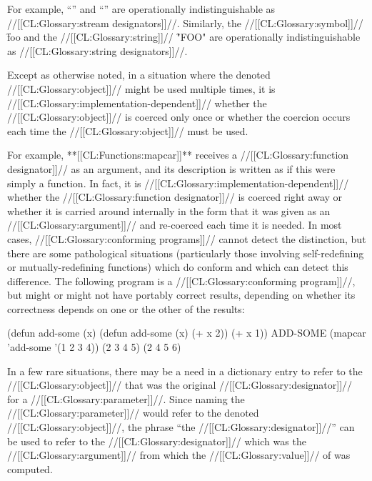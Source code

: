 For example, ``\nil'' and ``'' are operationally indistinguishable as //[[CL:Glossary:stream designators]]//.  Similarly,  the //[[CL:Glossary:symbol]]// \f{foo} and the //[[CL:Glossary:string]]// \f{"FOO"}  are operationally indistinguishable as //[[CL:Glossary:string designators]]//.  

Except as otherwise noted, in a situation where the denoted //[[CL:Glossary:object]]//  might be used multiple times, it is //[[CL:Glossary:implementation-dependent]]// whether the //[[CL:Glossary:object]]// is coerced only once or whether the coercion occurs each time the //[[CL:Glossary:object]]// must be used.

For example, **[[CL:Functions:mapcar]]** receives a //[[CL:Glossary:function designator]]// as an argument, and its description is written as if this were simply a function.  In fact, it is //[[CL:Glossary:implementation-dependent]]// whether the //[[CL:Glossary:function designator]]// is  coerced right away or whether it is carried around internally in the form that it was given as an //[[CL:Glossary:argument]]// and re-coerced each time it is needed.  In most cases, //[[CL:Glossary:conforming programs]]// cannot detect the distinction, but there are some  pathological situations (particularly those involving self-redefining or  mutually-redefining functions) which do conform and which can detect this difference. The following program is a //[[CL:Glossary:conforming program]]//, but might or might not have portably correct results, depending on whether its correctness depends on one or the other of the results:

\code
 (defun add-some (x) 
   (defun add-some (x) (+ x 2))
   (+ x 1)) \EV ADD-SOME
 (mapcar 'add-some '(1 2 3 4)) \EV (2 3 4 5) \OV (2 4 5 6) \endcode

In a few rare situations, there may be a need in a dictionary entry to refer to the //[[CL:Glossary:object]]// that was the original //[[CL:Glossary:designator]]// for a //[[CL:Glossary:parameter]]//. Since naming the //[[CL:Glossary:parameter]]// would refer to the denoted //[[CL:Glossary:object]]//, the phrase ``the  //[[CL:Glossary:designator]]//''  can be used to refer to the //[[CL:Glossary:designator]]// which was the //[[CL:Glossary:argument]]// from which the //[[CL:Glossary:value]]// of  was computed.

\endsubsubsection%


